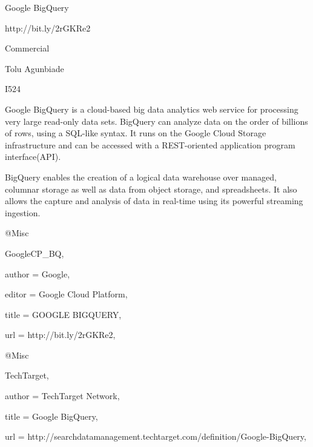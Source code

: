 Google BigQuery

http://bit.ly/2rGKRe2

Commercial

Tolu Agunbiade

I524

Google BigQuery is a cloud-based big data analytics web service for processing very large read-only data sets. BigQuery can analyze data on the order of billions of rows, using a SQL-like syntax. It runs on the Google Cloud Storage infrastructure and can be accessed with a REST-oriented application program interface(API)\cite{TechTarget}.

BigQuery enables the creation of a logical data warehouse over managed, columnar storage as well as data from object storage, and spreadsheets. It also allows the capture and analysis of data in real-time using its powerful streaming ingestion\cite{GoogleCP_BQ}.

@Misc{GoogleCP_BQ,

  author = {Google},

  editor = {Google Cloud Platform},

  title  = {GOOGLE BIGQUERY},

  url    = {http://bit.ly/2rGKRe2},

}


@Misc{TechTarget,

  author = {TechTarget Network},

  title  = {Google BigQuery},

  url    = {http://searchdatamanagement.techtarget.com/definition/Google-BigQuery},

}


